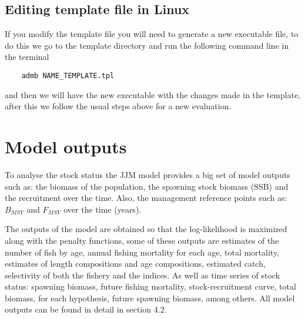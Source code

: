 \documentclass{article}
\begin{document}
\subsection{Editing template file in Linux}
If you modify the template file you will need to generate a new executable file, to do this we go to the template directory and run the following command line in the terminal
\begin{lstlisting}
    admb NAME_TEMPLATE.tpl 
    \end{lstlisting}
and then we will have the new executable with the changes made in the template, after this we follow the usual steps above for a new evaluation.




\section{Model outputs}

To analyse the stock status the JJM model provides a big set of model outputs such as: the biomass of the population, the spawning stock biomass (SSB) and the recruitment over the time. Also, the management reference points such as: \(B_{MSY}\) and \(F_{MSY}\) over the time (years).


The outputs of the model are obtained so that the log-likelihood is maximized along with the penalty functions, some of these outputs are estimates of the number of fish by age, annual fishing mortality for each age, total mortality, estimates of length compositions and age compositions, estimated catch, selectivity of both the fishery and the indices. As well as time series of stock status: spawning biomass, future fishing mortality, stock-recruitment curve, total biomass, for each hypothesis, future spawning biomass, among others. 
All model outputs can be found in detail in section 4.2. 


\end{document}
